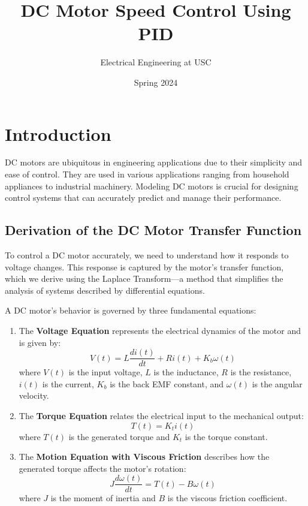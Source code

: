 \documentclass[11pt]{article}
\title{DC Motor Speed Control Using PID}
\author{Electrical Engineering at USC}
\date{Spring 2024}
\begin{document}
\maketitle

\section{Introduction}
DC motors are ubiquitous in engineering applications due to their simplicity and ease of control. They are used in various applications ranging from household appliances to industrial machinery. Modeling DC motors is crucial for designing control systems that can accurately predict and manage their performance.

\subsection{Derivation of the DC Motor Transfer Function}
To control a DC motor accurately, we need to understand how it responds to voltage changes. This response is captured by the motor's transfer function, which we derive using the Laplace Transform—a method that simplifies the analysis of systems described by differential equations.

A DC motor's behavior is governed by three fundamental equations:

\begin{enumerate}
    \item The \textbf{Voltage Equation} represents the electrical dynamics of the motor and is given by:
    \begin{equation}
    V(t) = L \frac{di(t)}{dt} + Ri(t) + K_b \omega(t)
    \end{equation}
    where \( V(t) \) is the input voltage, \( L \) is the inductance, \( R \) is the resistance, \( i(t) \) is the current, \( K_b \) is the back EMF constant, and \( \omega(t) \) is the angular velocity.
    
    \item The \textbf{Torque Equation} relates the electrical input to the mechanical output:
    \begin{equation}
    T(t) = K_t i(t)
    \end{equation}
    where \( T(t) \) is the generated torque and \( K_t \) is the torque constant.
    
    \item The \textbf{Motion Equation with Viscous Friction} describes how the generated torque affects the motor's rotation:
    \begin{equation}
    J \frac{d\omega(t)}{dt} = T(t) - B\omega(t)
    \end{equation}
    where \( J \) is the moment of inertia and \( B \) is the viscous friction coefficient.
\end{enumerate}
\end{document}
